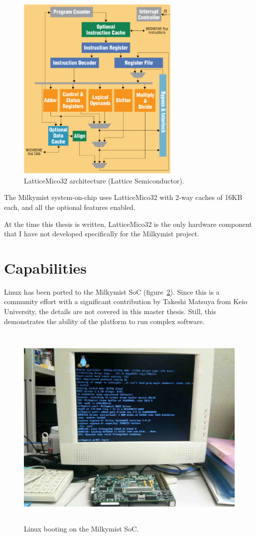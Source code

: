 \documentclass[a4paper,11pt]{kthesis}
\begin{document}
\begin{figure}[htp]
\centering
\includegraphics[height=90mm]{lm32arch.eps}
\caption{LatticeMico32 architecture (Lattice Semiconductor).}
\label{fig:lm32arch}
\end{figure}

The Milkymist system-on-chip uses LatticeMico32 with 2-way caches of 16KB each, and all the optional features enabled.

At the time this thesis is written, LatticeMico32 is the only hardware component that I have not developed specifically for the Milkymist project.

\section{Capabilities}
Linux has been ported to the Milkymist SoC (figure~\ref{fig:linux}). Since this is a community effort with a significant contribution by Takeshi Matsuya from Keio University, the details are not covered in this master thesis. Still, this demonstrates the ability of the platform to run complex software.

\begin{figure}[htp]
\centering
\includegraphics[height=100mm]{linux.eps}
\caption{Linux booting on the Milkymist SoC.}
\label{fig:linux}
\end{figure}
\end{document}
